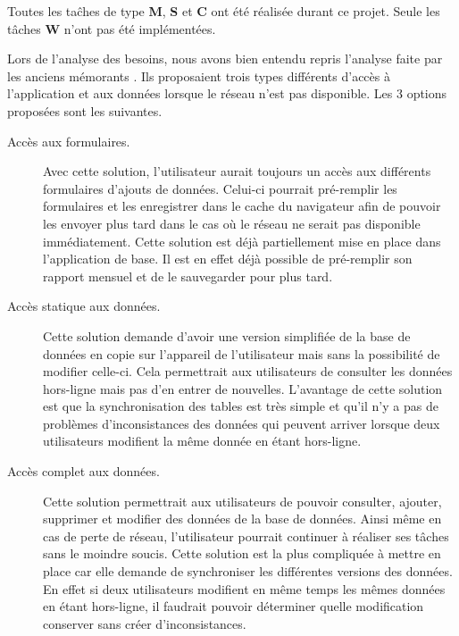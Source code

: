 \documentclass{EPL-master-thesis-covers-FR}
\begin{document}
			Toutes les taĉhes de type \textbf{M}, \textbf{S} et \textbf{C} ont été réalisée durant ce projet. Seule les tâches \textbf{W} n'ont pas été implémentées.
			
			Lors de l'analyse des besoins, nous avons bien entendu repris l'analyse faite par les anciens mémorants \cite{ref:haitiwater}. Ils proposaient trois types différents d'accès à l'application et aux données lorsque le réseau n'est pas disponible. Les 3 options proposées sont les suivantes. 
			\begin{description}
				\item[Accès aux formulaires.] Avec cette solution, l'utilisateur aurait toujours un accès aux différents formulaires d'ajouts de données. Celui-ci pourrait pré-remplir les formulaires et les enregistrer dans le cache du navigateur afin de pouvoir les envoyer plus tard dans le cas où le réseau ne serait pas disponible immédiatement. Cette solution est déjà partiellement mise en place dans l'application de base. Il est en effet déjà possible de pré-remplir son rapport mensuel et de le sauvegarder pour plus tard. %
				\item[Accès statique aux données.] Cette solution demande d'avoir une version simplifiée de la base de données en copie sur l'appareil de l'utilisateur mais sans la possibilité de modifier celle-ci. Cela permettrait aux utilisateurs de consulter les données hors-ligne mais pas d'en entrer de nouvelles. L'avantage de cette solution est que la synchronisation des tables est très simple et qu'il n'y a pas de problèmes d'inconsistances des données qui peuvent arriver lorsque deux utilisateurs modifient la même donnée en étant hors-ligne.
				\item[Accès complet aux données.] Cette solution permettrait aux utilisateurs de pouvoir consulter, ajouter, supprimer et modifier des données de la base de données. Ainsi même en cas de perte de réseau, l'utilisateur pourrait continuer à réaliser ses tâches sans le moindre soucis. Cette solution est la plus compliquée à mettre en place car elle demande de synchroniser les différentes versions des données. En effet si deux utilisateurs modifient en même temps les mêmes données en étant hors-ligne, il faudrait pouvoir déterminer quelle modification conserver sans créer d'inconsistances.  
			\end{description}
			
\end{document}
